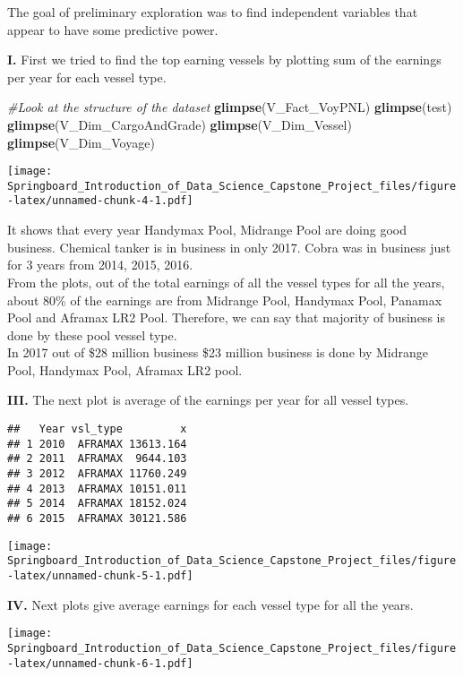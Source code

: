 \documentclass[]{article}
\newenvironment{Shaded}{\begin{snugshade}}{\end{snugshade}}
\newcommand{\KeywordTok}[1]{\textcolor[rgb]{0.13,0.29,0.53}{\textbf{#1}}}
\newcommand{\CommentTok}[1]{\textcolor[rgb]{0.56,0.35,0.01}{\textit{#1}}}
\newcommand{\NormalTok}[1]{#1}
\begin{document}
The goal of preliminary exploration was to find independent variables
that appear to have some predictive power.

\textbf{I.} First we tried to find the top earning vessels by plotting
sum of the earnings per year for each vessel type.

\begin{Shaded}
\begin{Highlighting}[]
\CommentTok{#Look at the structure of the dataset}
\KeywordTok{glimpse}\NormalTok{(V_Fact_VoyPNL)}
\KeywordTok{glimpse}\NormalTok{(test)}
\KeywordTok{glimpse}\NormalTok{(V_Dim_CargoAndGrade)}
\KeywordTok{glimpse}\NormalTok{(V_Dim_Vessel)}
\KeywordTok{glimpse}\NormalTok{(V_Dim_Voyage)}
\end{Highlighting}
\end{Shaded}

\texttt{[image: Springboard\_Introduction\_of\_Data\_Science\_Capstone\_Project\_files/figure-latex/unnamed-chunk-4-1.pdf]}

It shows that every year Handymax Pool, Midrange Pool are doing good
business. Chemical tanker is in business in only 2017. Cobra was in
business just for 3 years from 2014, 2015, 2016.\\
From the plots, out of the total earnings of all the vessel types for
all the years, about 80\% of the earnings are from Midrange Pool,
Handymax Pool, Panamax Pool and Aframax LR2 Pool. Therefore, we can say
that majority of business is done by these pool vessel type.\\
In 2017 out of \$28 million business \$23 million business is done by
Midrange Pool, Handymax Pool, Aframax LR2 pool.

\textbf{III.} The next plot is average of the earnings per year for all
vessel types.

\begin{verbatim}
##   Year vsl_type         x
## 1 2010  AFRAMAX 13613.164
## 2 2011  AFRAMAX  9644.103
## 3 2012  AFRAMAX 11760.249
## 4 2013  AFRAMAX 10151.011
## 5 2014  AFRAMAX 18152.024
## 6 2015  AFRAMAX 30121.586
\end{verbatim}

\texttt{[image: Springboard\_Introduction\_of\_Data\_Science\_Capstone\_Project\_files/figure-latex/unnamed-chunk-5-1.pdf]}

\textbf{IV.} Next plots give average earnings for each vessel type for
all the years.

\texttt{[image: Springboard\_Introduction\_of\_Data\_Science\_Capstone\_Project\_files/figure-latex/unnamed-chunk-6-1.pdf]}
\end{document}
